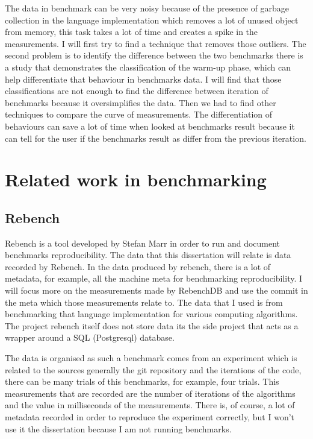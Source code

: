 \documentclass{article}
\begin{document}
The data in benchmark can be very noisy because of the presence of garbage collection in the language implementation which removes a lot of unused object from memory, this task takes a lot of time and creates a spike in the measurements. I will first try to find a technique that removes those outliers. The second problem is to identify the difference between the two benchmarks there is a study that demonstrates the classification of the warm-up phase, which can help differentiate that behaviour in benchmarks data. I will find that those classifications are not enough to find the difference between iteration of benchmarks because it oversimplifies the data. Then we had to find other techniques to compare the curve of measurements. The differentiation of behaviours can save a lot of time when looked at benchmarks result because it can tell for the user if the benchmarks result as differ from the previous iteration.



\section{Related work in benchmarking}

\subsection{Rebench}

Rebench is a tool developed by Stefan Marr in order to run and document benchmarks reproducibility. The data that this dissertation will relate is data recorded by Rebench. In the data produced by rebench, there is a lot of metadata, for example, all the machine meta for benchmarking reproducibility. I will focus more on the measurements made by RebenchDB and use the commit in the meta which those measurements relate to. The data that I used is from benchmarking that language implementation for various computing algorithms. The project rebench itself does not store data its the side project that acts as a wrapper around a SQL (Postgresql) database.

The data is organised as such a benchmark comes from an experiment which is related to the sources generally the git repository and the iterations of the code, there can be many trials of this benchmarks, for example, four trials. This measurements that are recorded are the number of iterations of the algorithms and the value in milliseconds of the measurements. There is, of course, a lot of metadata recorded in order to reproduce the experiment correctly, but I won't use it the dissertation because I am not running benchmarks.
\end{document}
